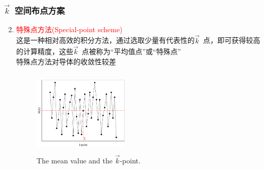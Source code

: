 \frame
{
\frametitle{$\vec k$~空间布点方案}
\begin{enumerate}
	\setcounter{enumi}{1}
	\item \textcolor{red}{特殊点方法\textrm{(Special-point scheme)}}\\这是一种相对高效的积分方法，通过选取少量有代表性的$\vec k$~点，即可获得较高的计算精度，这些$\vec k$~点被称为“平均值点”或“特殊点”\\特殊点方法对导体的收敛性较差
\begin{figure}[h!]
\centering
\includegraphics[height=1.6in,width=1.8in,viewport=5 0 960 750,clip]{Figures/Brillouin-k.png}
\caption{\tiny \textrm{The mean value and the $\vec k$-point.}}%
\label{Brillouin-k}
\end{figure} 
\end{enumerate}
}

